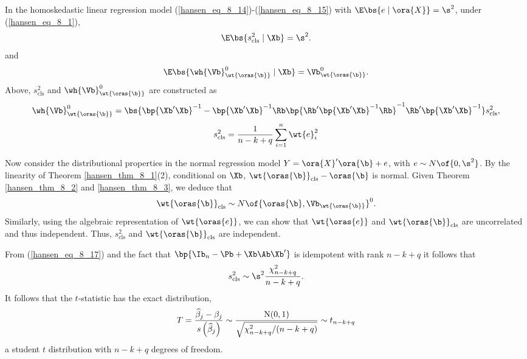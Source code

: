 \begin{theorem}
    \label{hansen_thm_8_4}
    In the homoskedastic linear regression model (\ref{hansen_eq_8_14})-(\ref{hansen_eq_8_15}) with $\E\bs{e \mid \ora{X}} = \s^2$, under (\ref{hansen_eq_8_1}),
    \begin{equation}
        \notag 
        \E\bs{s_{\text{cls}}^2 \mid \Xb} = \s^2.
    \end{equation}
    and 
    \begin{equation}
        \notag 
        \E\bs{\wh{\Vb}_{\wt{\oras{\b}}}^0 \mid \Xb} = {\Vb}_{\wt{\oras{\b}}}^0.
    \end{equation}
    Above, $s_{\text{cls}}^2$ and $\wh{\Vb}_{\wt{\oras{\b}}}^0$ are constructed as  
    \begin{equation}
        \notag 
        \wh{\Vb}_{\wt{\oras{\b}}}^0 = \bs{\bp{\Xb^{\prime} \Xb}^{-1} - \bp{\Xb^{\prime} \Xb}^{-1} \Rb \bp{\Rb^{\prime} \bp{\Xb^{\prime} \Xb}^{-1} \Rb}^{-1} \Rb^{\prime} \bp{\Xb^{\prime} \Xb}^{-1}} s_{\text{cls}}^2,
    \end{equation}
    \begin{equation}
        \notag
        s_{\text{cls}}^2 = \frac{1}{n - k + q} \sum_{i=1}^{n} \wt{e}_i^2
    \end{equation}
\end{theorem}

Now consider the distributional properties in the normal regression model $Y = \ora{X}^{\prime}\ora{\b} + e$, with $e \sim N\of{0, \s^2}$. By the linearity of Theorem \ref{hansen_thm_8_1}(2), conditional on $\Xb$, $\wt{\oras{\b}}_{\text{cls}} - \oras{\b}$ is normal. Given Theorem \ref{hansen_thm_8_2} and \ref{hansen_thm_8_3}, we deduce that 
\begin{equation}
    \notag 
    \wt{\oras{\b}}_{\text{cls}} \sim N\of{\oras{\b}, \Vb_{\wt{\oras{\b}}}}^0.
\end{equation}
Similarly, using the algebraic representation of $\wt{\oras{e}}$, we can show that $\wt{\oras{e}}$ and $\wt{\oras{\b}}_{\text{cls}}$ are uncorrelated and thus independent. Thus, $s_{\text{cls}}^2$ and $\wt{\oras{\b}}_{\text{cls}}$ are independent.

From (\ref{hansen_eq_8_17}) and the fact that $\bp{\Ib_n - \Pb + \Xb \Ab \Xb^{\prime}}$ is idempotent with rank $n - k + q$ it follows that 
\begin{equation}
    \notag 
    s_{\text{cls}}^2 \sim \s^2 \frac{\chi_{n-k+q}^2}{n-k+q}.
\end{equation}
It follows that the $t$-statistic has the exact distribution, 
\begin{equation}
    \notag 
    T=\frac{\widehat{\beta}_j-\beta_j}{s\left(\widehat{\beta}_j\right)} \sim \frac{\mathrm{N}(0,1)}{\sqrt{\chi_{n-k+q}^2 /(n-k+q)}} \sim t_{n-k+q}
\end{equation}
a student $t$ distribution with $n - k + q$ degrees of freedom.

